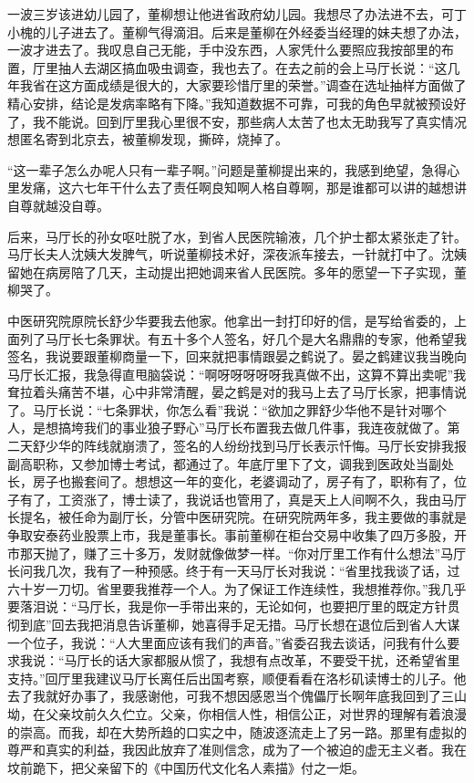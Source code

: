 \documentclass[12pt,oneside]{book}
\begin{document}
一波三岁该进幼儿园了，董柳想让他进省政府幼儿园。我想尽了办法进不去，可丁小槐的儿子进去了。董柳气得滴泪。后来是董柳在外经委当经理的妹夫想了办法，一波才进去了。我叹息自己无能，手中没东西，人家凭什么要照应我按部里的布置，厅里抽人去湖区搞血吸虫调查，我也去了。在去之前的会上马厅长说：``这几年我省在这方面成绩是很大的，大家要珍惜厅里的荣誉。''调查在选址抽样方面做了精心安排，结论是发病率略有下降。''我知道数据不可靠，可我的角色早就被预设好了，我不能说。回到厅里我心里很不安，那些病人太苦了也太无助我写了真实情况想匿名寄到北京去，被董柳发现，撕碎，烧掉了。

``这一辈子怎么办呢人只有一辈子啊。''问题是董柳提出来的，我感到绝望，急得心里发痛，这六七年干什么去了责任啊良知啊人格自尊啊，那是谁都可以讲的越想讲自尊就越没自尊。

后来，马厅长的孙女呕吐脱了水，到省人民医院输液，几个护士都太紧张走了针。马厅长夫人沈姨大发脾气，听说董柳技术好，深夜派车接去，一针就打中了。沈姨留她在病房陪了几天，主动提出把她调来省人民医院。多年的愿望一下子实现，董柳哭了。

中医研究院原院长舒少华要我去他家。他拿出一封打印好的信，是写给省委的，上面列了马厅长七条罪状。有五十多个人签名，好几个是大名鼎鼎的专家，他希望我签名，我说要跟董柳商量一下，回来就把事情跟晏之鹤说了。晏之鹤建议我当晚向马厅长汇报，我急得直甩脑袋说：``啊呀呀呀呀呀我真做不出，这算不算出卖呢''我耷拉着头痛苦不堪，心中非常清醒，晏之鹤是对的我马上去了马厅长家，把事情说了。马厅长说：``七条罪状，你怎么看''我说：``欲加之罪舒少华他不是针对哪个人，是想搞垮我们的事业狼子野心''马厅长布置我去做几件事，我连夜就做了。第二天舒少华的阵线就崩溃了，签名的人纷纷找到马厅长表示忏悔。马厅长安排我报副高职称，又参加博士考试，都通过了。年底厅里下了文，调我到医政处当副处长，房子也搬套间了。想想这一年的变化，老婆调动了，房子有了，职称有了，位子有了，工资涨了，博士读了，我说话也管用了，真是天上人间啊不久，我由马厅长提名，被任命为副厅长，分管中医研究院。在研究院两年多，我主要做的事就是争取安泰药业股票上市，我是董事长。事前董柳在柜台交易中收集了四万多股，开市那天抛了，赚了三十多万，发财就像做梦一样。``你对厅里工作有什么想法''马厅长问我几次，我有了一种预感。终于有一天马厅长对我说：``省里找我谈了话，过六十岁一刀切。省里要我推荐一个人。为了保证工作连续性，我想推荐你。''我几乎要落泪说：``马厅长，我是你一手带出来的，无论如何，也要把厅里的既定方针贯彻到底''回去我把消息告诉董柳，她喜得手足无措。马厅长想在退位后到省人大谋一个位子，我说：``人大里面应该有我们的声音。''省委召我去谈话，问我有什么要求我说：``马厅长的话大家都服从惯了，我想有点改革，不要受干扰，还希望省里支持。''回厅里我建议马厅长离任后出国考察，顺便看看在洛杉矶读博士的儿子。他去了我就好办事了，我感谢他，可我不想因感恩当个傀儡厅长啊年底我回到了三山坳，在父亲坟前久久伫立。父亲，你相信人性，相信公正，对世界的理解有着浪漫的崇高。而我，却在大势所趋的口实之中，随波逐流走上了另一路。那里有虚拟的尊严和真实的利益，我因此放弃了准则信念，成为了一个被迫的虚无主义者。我在坟前跪下，把父亲留下的《中国历代文化名人素描》付之一炬。
\end{document}
